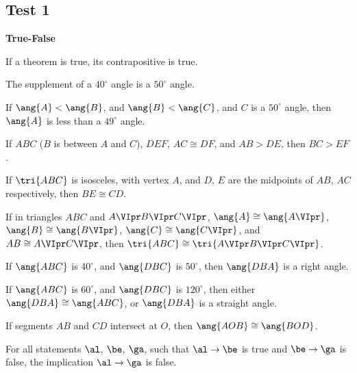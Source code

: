 \documentclass[11pt]{book}
\theoremstyle{bkplain}
\theoremstyle{XIplainnote}
\theoremstyle{bkplain}
\theoremstyle{bkplain}
\begin{document}
\subsection*{Test 1}
\begin{center}\bfseries True-False\end{center}
\begin{exlist}
\item If a theorem is true, its contrapositive is true.
\item The supplement of a $40^\circ$ angle is a $50^\circ$ angle.
\item If $\ang{A} < \ang{B}$, and $\ang{B} < \ang{C}$, and $C$ is a $50^\circ$
  angle, then $\ang{A}$ is less than a $49^\circ$ angle.
\item If $ABC$ ($B$ is between $A$ and $C$), $DEF$, $AC \cong DF$, and $AB >
  DE$, then $BC > EF$.
\item If $\tri{ABC}$ is isosceles, with vertex $A$, and $D$, $E$ are the
  midpoints of $AB$, $AC$ respectively, then $BE \cong CD$.
\item If in triangles $ABC$ and $A\VIpr B\VIpr C\VIpr$, $\ang{A} \cong
  \ang{A\VIpr}$, $\ang{B} \cong \ang{B\VIpr}$, $\ang{C} \cong \ang{C\VIpr}$,
  and $AB \cong A\VIpr C\VIpr$, then $\tri{ABC} \cong \tri{A\VIpr B\VIpr
  C\VIpr}$.
\item If $\ang{ABC}$ is $40^\circ$, and $\ang{DBC}$ is $50^\circ$, then
  $\ang{DBA}$ is a right angle.
\item If $\ang{ABC}$ is $60^\circ$, and $\ang{DBC}$ is $120^\circ$, then either
  $\ang{DBA} \cong \ang{ABC}$, or $\ang{DBA}$ is a straight angle.
\item If segments $AB$ and $CD$ intersect at $O$, then $\ang{AOB} \cong
  \ang{BOD}$.
\item For all statements $\al$, $\be$, $\ga$, such that $\al \to \be$ is true
  and $\be \to \ga$ is false, the implication $\al \to \ga$ is false.
\end{exlist}
\end{document}
